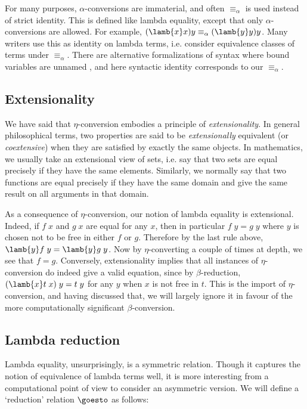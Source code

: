 For many purposes, $\alpha$-conversions are immaterial, and often
$\equiv_{\alpha}$ is used instead of strict identity. This is defined like
lambda equality, except that only $\alpha$-conversions are allowed. For
example, $(\lamb{x} x) y \equiv_{\alpha} (\lamb{y} y) y$. Many writers use this
as identity on lambda terms, i.e. consider equivalence classes of terms under
$\equiv_{\alpha}$. There are alternative formalizations of syntax where bound
variables are unnamed \cite{debruijn-terms}, and here syntactic identity
corresponds to our $\equiv_{\alpha}$.

\subsection{Extensionality}

We have said that $\eta$-conversion embodies a principle of {\em
extensionality}. In general philosophical terms, two properties are said to be
{\em extensionally} equivalent (or {\em coextensive}) when they are satisfied
by exactly the same objects. In mathematics, we usually take an extensional
view of sets, i.e. say that two sets are equal precisely if they have the same
elements. Similarly, we normally say that two functions are equal precisely if
they have the same domain and give the same result on all arguments in that
domain.

As a consequence of $\eta$-conversion, our notion of lambda equality is
extensional. Indeed, if $f\;x$ and $g\;x$ are equal for any $x$, then in
particular $f\;y = g\;y$ where $y$ is chosen not to be free in either $f$ or
$g$. Therefore by the last rule above, $\lamb{y} f\;y = \lamb{y} g\;y$. Now by
$\eta$-converting a couple of times at depth, we see that $f = g$. Conversely,
extensionality implies that all instances of $\eta$-conversion do indeed give a
valid equation, since by $\beta$-reduction, $(\lamb{x} t\;x)\;y = t\;y$ for any
$y$ when $x$ is not free in $t$. This is the import of $\eta$-conversion, and
having discussed that, we will largely ignore it in favour of the more
computationally significant $\beta$-conversion.

\subsection{Lambda reduction}

Lambda equality, unsurprisingly, is a symmetric relation. Though it captures
the notion of equivalence of lambda terms well, it is more interesting from a
computational point of view to consider an asymmetric version. We will define a
`reduction' relation $\goesto$ as follows:

